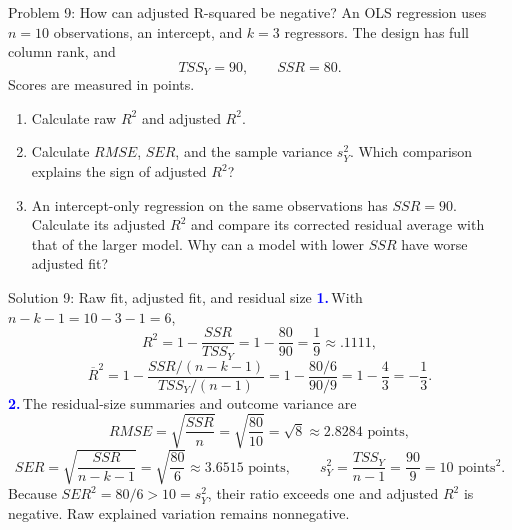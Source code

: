 \documentclass[notes,10pt, aspectratio=169]{beamer}
\newif\ifshowsolutions
\newcommand{\answerpart}[1]{\textcolor{blue}{\textbf{#1.}}\,}
\begin{document}
\begin{frame}{Problem 9: How can adjusted R-squared be negative?}
An OLS regression uses $n=10$ observations, an intercept, and $k=3$ regressors. The design has full column rank, and
\[
TSS_Y=90,\qquad SSR=80.
\]
Scores are measured in points.
\begin{enumerate}
\setlength{\itemsep}{13pt}
\item Calculate raw $R^2$ and adjusted $R^2$.
\item Calculate $RMSE$, $SER$, and the sample variance $s_Y^2$. Which comparison explains the sign of adjusted $R^2$?
\item An intercept-only regression on the same observations has $SSR=90$. Calculate its adjusted $R^2$ and compare its corrected residual average with that of the larger model. Why can a model with lower $SSR$ have worse adjusted fit?
\end{enumerate}
\end{frame}

\ifshowsolutions
\begin{frame}{Solution 9: Raw fit, adjusted fit, and residual size}
\small
\answerpart{1}With $n-k-1=10-3-1=6$,
\[
R^2=1-\frac{SSR}{TSS_Y}=1-\frac{80}{90}=\boxed{\frac19\approx.1111},
\]
\[
\overline R^2=1-\frac{SSR/(n-k-1)}{TSS_Y/(n-1)}
=1-\frac{80/6}{90/9}=1-\frac43=\boxed{-\frac13}.
\]
\answerpart{2}The residual-size summaries and outcome variance are
\[
RMSE=\sqrt{\frac{SSR}{n}}=\sqrt{\frac{80}{10}}=\sqrt8\approx2.8284\text{ points},
\]
\[
SER=\sqrt{\frac{SSR}{n-k-1}}=\sqrt{\frac{80}{6}}\approx3.6515\text{ points},
\qquad
s_Y^2=\frac{TSS_Y}{n-1}=\frac{90}{9}=10\text{ points}^2.
\]
Because $SER^2=80/6>10=s_Y^2$, their ratio exceeds one and adjusted $R^2$ is negative. Raw explained variation remains nonnegative.
\end{frame}
\end{document}
